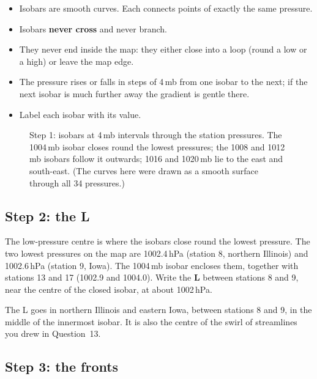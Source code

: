 \begin{keybox}
\begin{itemize}
\item Isobars are smooth curves. Each connects points of exactly the same pressure.
\item Isobars \textbf{never cross} and never branch.
\item They never end inside the map: they either close into a loop (round a low or a high) or leave the map edge.
\item The pressure rises or falls in steps of 4\,mb from one isobar to the next; if the next isobar is much further away the gradient is gentle there.
\item Label each isobar with its value.
\end{itemize}
\end{keybox}

\begin{figure}[ht]
\centering
\mapbase{0.0196cm}{}
\caption{Step 1: isobars at 4\,mb intervals through the station pressures. The 1004\,mb isobar closes round the lowest pressures; the 1008 and 1012\,mb isobars follow it outwards; 1016 and 1020\,mb lie to the east and south-east. (The curves here were drawn as a smooth surface through all 34 pressures.)}\label{p3-fig:isobars}
\end{figure}

\subsection{Step 2: the L}

The low-pressure centre is where the isobars close round the lowest pressure. The two lowest pressures on the map are 1002.4\,hPa (station 8, northern Illinois) and 1002.6\,hPa (station 9, Iowa). The 1004\,mb isobar encloses them, together with stations 13 and 17 (1002.9 and 1004.0). Write the \textbf{L} between stations 8 and 9, near the centre of the closed isobar, at about 1002\,hPa.

\begin{answerbox}
The L goes in northern Illinois and eastern Iowa, between stations 8 and 9, in the middle of the innermost isobar. It is also the centre of the swirl of streamlines you drew in Question~13.
\end{answerbox}

\subsection{Step 3: the fronts}

